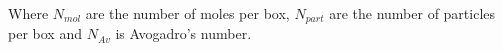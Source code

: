 \documentclass[aps,pre,nofootinbib,superscriptaddress,linenumbers,10pt, draft,tightenlines]{revtex4-1}
\begin{document}
\begin{itemize}
\begin{itemize}
    	Where $N_{mol}$ are the number of moles per box, $N_{part}$ are the number of particles per box and $N_{Av}$ 
    	is Avogadro's number.
    	

\end{itemize}
\end{itemize}
\end{document}
